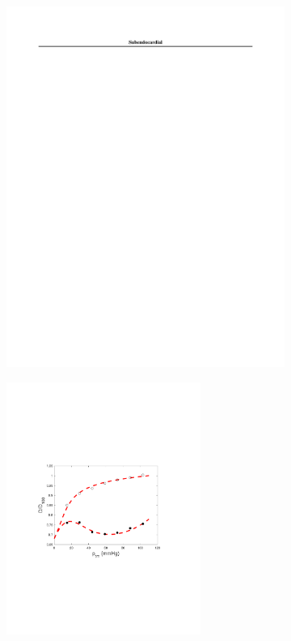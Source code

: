 \documentclass[../main.tex]{article}
\begin{document}
\begin{figure}[t!]
\begin{center}
\begin{subfigure}{0.45\textwidth}
		\end{subfigure}
		\begin{subfigure}{\textwidth}
			\centering
			\includegraphics[trim={1.25in 9.75in 1.25in 0.875in},clip]{Subendocardial.pdf}
		\end{subfigure}
		\begin{subfigure}{0.45\textwidth}
			\centering
			\includegraphics[width=2.5in,trim={3.25cm 8cm 4cm 8cm},clip]{A_subendo.pdf}

\end{subfigure}
\end{center}
\end{figure}
\end{document}
